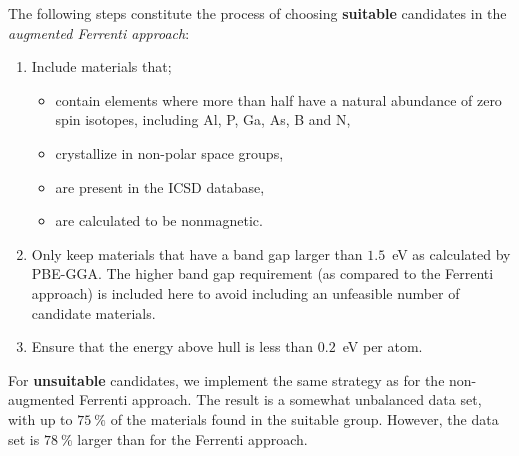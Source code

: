 \documentclass[superscriptaddress,unsortedaddress,
 amsmath,amssymb,
 aps,
]{revtex4-2}
\begin{document}
The following steps constitute the process of choosing \textbf{suitable} candidates 
in the \emph{augmented Ferrenti approach}:
\begin{enumerate}
    \item Include materials that; 
    \begin{itemize}
        \item contain elements where more than half have a natural abundance of zero spin isotopes, including Al, P, Ga, As, B and N, 
        \item crystallize in non-polar space groups,
        \item are present in the ICSD database,
        \item are calculated to be nonmagnetic. 
    \end{itemize}
    \item Only keep materials that have a band gap larger than $1.5$~eV as calculated by PBE-GGA. The higher band gap requirement (as compared to the Ferrenti approach) is included here to avoid including an unfeasible number of candidate materials. 
    \item Ensure that the energy above hull is less than $0.2$~eV per atom. 
\end{enumerate}

For \textbf{unsuitable} candidates, we implement the same strategy as for the non-augmented Ferrenti approach. The result is a somewhat unbalanced data set, with up to $75 \ \%$ of the materials found in the suitable group. However, the data set is $78 \ \%$ larger than for the Ferrenti approach.
\end{document}
